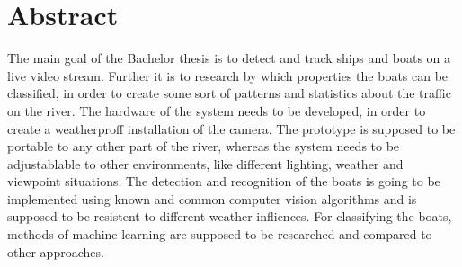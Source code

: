 \chapter{Abstract}
The main goal of the Bachelor thesis is to detect and track ships and boats on a live video stream. Further it is to research by which properties the boats can be classified, in order to 
create some sort of patterns and statistics about the traffic on the river. 
The hardware of the system needs to be developed, in order to create a weatherproff installation of the camera. The prototype is supposed to be portable to any other part of the river, whereas the system needs to be adjustablable to other environments, like different lighting, weather and viewpoint situations. 
The detection and recognition of the boats is going to be implemented using known and common computer vision algorithms and is supposed to be resistent to different weather infliences. For classifying the boats, methods of machine learning are supposed to be researched and compared to other approaches.